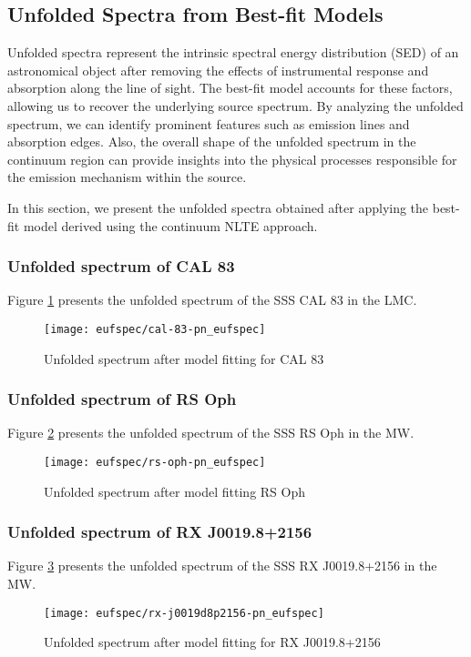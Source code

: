 		\newpage
		\subsection{Unfolded Spectra from Best-fit Models}
			Unfolded spectra represent the intrinsic spectral energy distribution (SED) of an astronomical object after removing the effects of instrumental response and absorption along the line of sight. The best-fit model accounts for these factors, allowing us to recover the underlying source spectrum. By analyzing the unfolded spectrum, we can identify prominent features such as emission lines and absorption edges. Also, the overall shape of the unfolded spectrum in the continuum region can provide insights into the physical processes responsible for the emission mechanism within the source.
			
			In this section, we present the unfolded spectra obtained after applying the best-fit model derived using the continuum NLTE approach.
		
			\subsubsection*{Unfolded spectrum of CAL 83}
				Figure \ref{result:euf-cal-83} presents the unfolded spectrum of the SSS CAL 83 in the LMC.
				\begin{figure}[h!]
					\centering
					\texttt{[image: eufspec/cal-83-pn\_eufspec]}
					\caption{Unfolded spectrum after model fitting for CAL 83}
					\label{result:euf-cal-83}
				\end{figure}
			
			\newpage
			\subsubsection*{Unfolded spectrum of RS Oph}
				Figure \ref{result:euf-rs-oph} presents the unfolded spectrum of the SSS RS Oph in the MW.
				\begin{figure}[h!]
					\centering
					\texttt{[image: eufspec/rs-oph-pn\_eufspec]}
					\caption{Unfolded spectrum after model fitting RS Oph}
					\label{result:euf-rs-oph}
				\end{figure}
			
			\subsubsection*{Unfolded spectrum of RX J0019.8+2156}
				Figure \ref{result:euf-rx-j0019} presents the unfolded spectrum of the SSS RX J0019.8+2156 in the MW.
				\begin{figure}[h!]
					\centering
					\texttt{[image: eufspec/rx-j0019d8p2156-pn\_eufspec]}
					\caption{Unfolded spectrum after model fitting for RX J0019.8+2156}
					\label{result:euf-rx-j0019}
				\end{figure}
			
